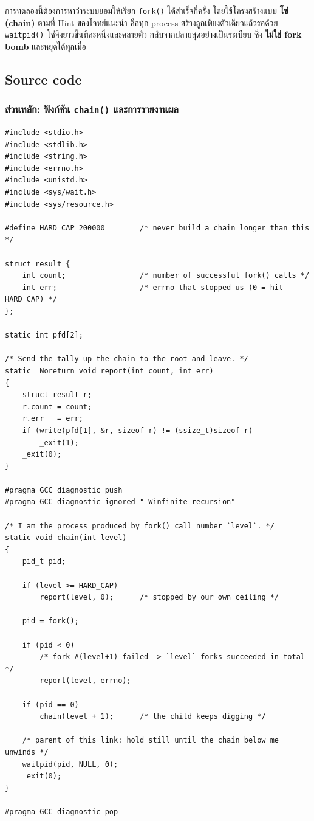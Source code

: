 \documentclass[a4paper,12pt]{article}
\newcommand{\code}[1]{\texttt{#1}}
\begin{document}
การทดลองนี้ต้องการหาว่าระบบยอมให้เรียก \code{fork()} ได้สำเร็จกี่ครั้ง
โดยใช้โครงสร้างแบบ \textbf{โซ่ (chain)} ตามที่ Hint ของโจทย์แนะนำ คือทุก process
สร้างลูกเพียงตัวเดียวแล้วรอด้วย \code{waitpid()} โซ่จึงยาวขึ้นทีละหนึ่งและคลายตัว
กลับจากปลายสุดอย่างเป็นระเบียบ ซึ่ง \textbf{ไม่ใช่ fork bomb} และหยุดได้ทุกเมื่อ

\subsection{Source code}

\subsubsection{ส่วนหลัก: ฟังก์ชัน \code{chain()} และการรายงานผล}

\begin{lstlisting}[caption={q3\_forkcount.c -- the chain and the reporting path},label={lst:q3a}]
#include <stdio.h>
#include <stdlib.h>
#include <string.h>
#include <errno.h>
#include <unistd.h>
#include <sys/wait.h>
#include <sys/resource.h>

#define HARD_CAP 200000        /* never build a chain longer than this */

struct result {
    int count;                 /* number of successful fork() calls */
    int err;                   /* errno that stopped us (0 = hit HARD_CAP) */
};

static int pfd[2];

/* Send the tally up the chain to the root and leave. */
static _Noreturn void report(int count, int err)
{
    struct result r;
    r.count = count;
    r.err   = err;
    if (write(pfd[1], &r, sizeof r) != (ssize_t)sizeof r)
        _exit(1);
    _exit(0);
}

#pragma GCC diagnostic push
#pragma GCC diagnostic ignored "-Winfinite-recursion"

/* I am the process produced by fork() call number `level`. */
static void chain(int level)
{
    pid_t pid;

    if (level >= HARD_CAP)
        report(level, 0);      /* stopped by our own ceiling */

    pid = fork();

    if (pid < 0)
        /* fork #(level+1) failed -> `level` forks succeeded in total */
        report(level, errno);

    if (pid == 0)
        chain(level + 1);      /* the child keeps digging */

    /* parent of this link: hold still until the chain below me unwinds */
    waitpid(pid, NULL, 0);
    _exit(0);
}

#pragma GCC diagnostic pop
\end{lstlisting}
\end{document}

